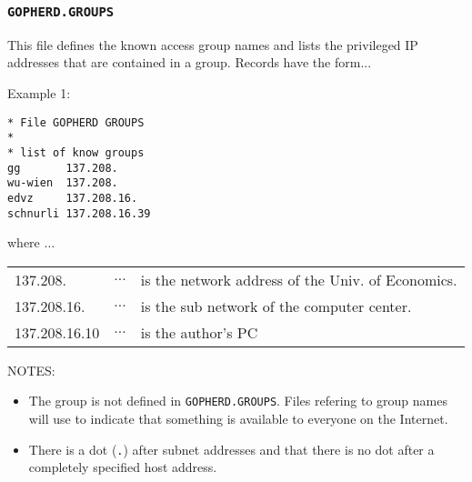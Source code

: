 \subsubsection{{\tt GOPHERD.GROUPS}}\label{groupfile}
 
  This file defines the known access group names and lists the
  privileged IP addresses that are contained in a group.
  Records have the form...\\
\rule{0mm}{1mm}

\begin{center} 
\end{center}

\rule{0mm}{3mm}

\noindent Example 1:\\ \rule{0mm}{1mm}

\begin{center}
\begin{verbatim}
* File GOPHERD GROUPS
*
* list of know groups
gg       137.208.
wu-wien  137.208.
edvz     137.208.16.
schnurli 137.208.16.39
\end{verbatim}
\end{center}

\rule{0mm}{5mm}

\noindent where $\ldots$\\ \rule{0mm}{1mm}

\noindent\begin{tabular}{|lcl|}\hline
137.208.       &$\ldots$& is the network address of the Univ. of Economics. \\
137.208.16.    &$\ldots$& is the sub network of the computer center.        \\
137.208.16.10  &$\ldots$& is the author's PC                                \\
\hline\end{tabular}

\rule{0mm}{5mm}

\noindent NOTES:
\begin{itemize}
\item   The group {\tt *} is not defined in {\tt GOPHERD.GROUPS}.
        Files refering to group names will use {\tt *} to indicate that
        something is available to everyone on the Internet.
\item   There is a dot ({\tt .}) after subnet addresses and
        that there is no dot after a completely specified host address.
\end{itemize}



